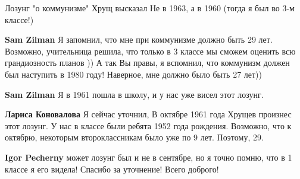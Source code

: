 \begin{itemize}
Лозунг "о коммунизме" Хрущ высказал Не в 1963, а в 1960 (тогда я был во 3-м
классе!)

\begin{itemize}
 
\textbf{Sam Zilman} Я запомнил, что мне при коммунизме должно быть 29 лет.
Возможно, учительница решила, что только в 3 классе мы сможем оценить всю
грандиозность планов )) А так Вы правы, я вспомнил, что коммунизм должен был
наступить в 1980 году! Наверное, мне должно было быть 27 лет))


 
\textbf{Sam Zilman} Я в 1961 пошла в школу, и у нас уже висел этот лозунг.

\begin{itemize}
 

\textbf{Лариса Коновалова} Я сейчас уточнил, В октябре 1961 года Хрущев
произнес этот лозунг. У нас в классе были ребята 1952 года рождения. Возможно,
что к октябрю, некоторым второклассникам было уже по 9 лет. Поэтому, 29.


 
\textbf{Igor Pecherny} может лозунг был и не в сентябре, но я точно помню, что
в 1 классе я его видела! Спасибо за уточнение! Всего доброго!
\end{itemize}

\end{itemize}

 


\end{itemize}
